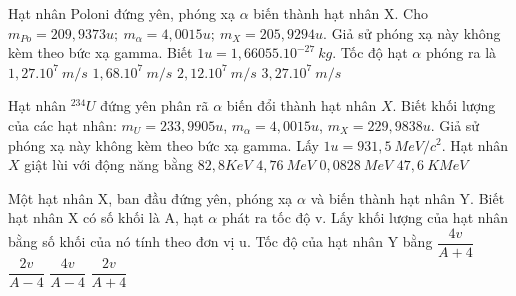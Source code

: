 \begin{vidu*}%
Hạt nhân Poloni đứng yên, phóng xạ $\alpha$ biến thành hạt nhân X. Cho $m_{Po}=209,9373u;\ m_{\alpha}=4,0015u;\ {m_X}=205,9294u$. Giả sử phóng xạ này không kèm theo bức xạ gamma. Biết $1u=1,66055.10^{-27}\ kg$. Tốc độ hạt $\alpha$ phóng ra là
\choice
{$1,27.10^{7}\ m/s$}
{\True $1,68.10^{7}\ m/s$}
{$2,12.10^{7}\ m/s$}
{$3,27.10^{7}\ m/s$}
\end{vidu*}
\begin{vidu}%
Hạt nhân $^{234}U$ đứng yên phân rã $\alpha$ biến đổi thành hạt nhân $X$. Biết khối lượng của các hạt nhân: $m_U=233,9905u$, $m_\alpha =4,0015u$, $m_X=229,9838u$. Giả sử phóng xạ này không kèm theo bức xạ gamma. Lấy $1u=931,5\ MeV/c^2$. Hạt nhân $X$ giật lùi với động năng bằng
\choice
{$82,8 KeV$}
{$4,76\ MeV$}
{\True $0,0828\ MeV$}
{$47,6\ KMeV$}
\end{vidu}
\begin{vidu}%
 Một hạt nhân X, ban đầu đứng yên, phóng xạ $\alpha$ và biến thành hạt nhân Y. Biết hạt nhân X có số khối là A, hạt $\alpha$ phát ra tốc độ v. Lấy khối lượng của hạt nhân bằng số khối của nó tính theo đơn vị u. Tốc độ của hạt nhân Y bằng
\choice
{$\dfrac{4v}{A+4}$}
{$\dfrac{2v}{A-4}$}
{\True $\dfrac{4v}{A-4}$}
{$\dfrac{2v}{A+4}$}
\end{vidu}
